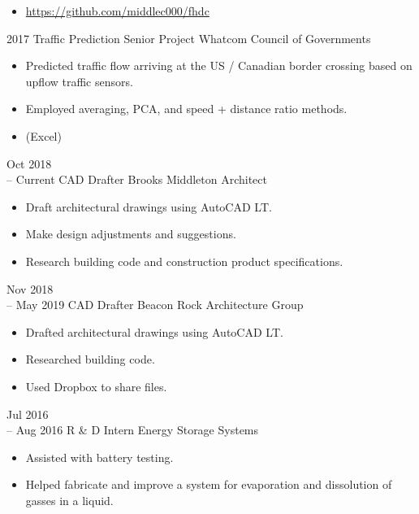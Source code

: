 \documentclass[11pt]{developercv} %
\newcommand{\vsp}{\vspace{-10pt}}
\begin{document}
\begin{entrylist}
{\begin{itemize}
			\item \url{https://github.com/middlec000/fhdc}
		\end{itemize}}
	\entry
		{2017}
		{Traffic Prediction Senior Project}
		{Whatcom Council of Governments}
		{\vspace{-0.5cm}\begin{itemize}
			\item Predicted traffic flow arriving at the US / Canadian border crossing based on upflow traffic sensors.
			\item Employed averaging, PCA, and speed + distance ratio methods.
			\item (Excel)
		\end{itemize}}
\end{entrylist}
\vsp

\begin{entrylist}
	\entry
		{Oct 2018 \\
		-- Current}
		{CAD Drafter}
		{Brooks Middleton Architect}
		{\vspace{-0.5cm}\begin{itemize}
			\item Draft architectural drawings using AutoCAD LT.
			\item Make design adjustments and suggestions.
			\item Research building code and construction product specifications.
		\end{itemize}}
	\entry
		{Nov 2018 \\
		-- May 2019}
		{CAD Drafter}
		{Beacon Rock Architecture Group}
		{\vspace{-0.5cm}\begin{itemize}
			\item Drafted architectural drawings using AutoCAD LT.
			\item Researched building code.
			\item Used Dropbox to share files.
		\end{itemize}}
	\entry
		{Jul 2016 \\
		-- Aug 2016}
		{R \& D Intern}
		{Energy Storage Systems}
		{\vspace{-0.5cm}\begin{itemize}
			\item Assisted with battery testing.
			\item Helped fabricate and improve a system for evaporation and dissolution of gasses in a liquid.
		\end{itemize}}
\end{entrylist}
\vsp
\end{document}
